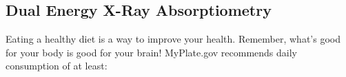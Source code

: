 \subsection{Dual Energy X-Ray Absorptiometry}

Eating a healthy diet is a way to improve your health. Remember, what’s good for your body is good for your brain! MyPlate.gov recommends daily consumption of at least:  